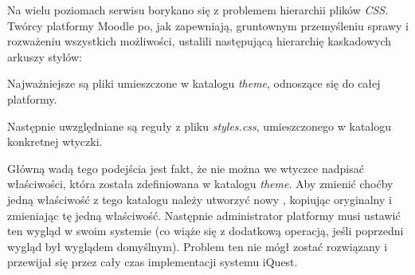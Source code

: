 Na wielu poziomach serwisu borykano się z problemem hierarchii plików \textit{CSS}. Twórcy platformy Moodle po, jak zapewniają, gruntownym przemyśleniu sprawy i rozważeniu wszystkich możliwości, ustalili następującą hierarchię kaskadowych arkuszy stylów:
\begin{description}
\item Najważniejsze są pliki umieszczone w katalogu \textit{theme}, odnoszące się do całej platformy.
\item Następnie uwzględniane są reguły z pliku \textit{styles.css}, umieszczonego w katalogu konkretnej wtyczki.
\end{description}
Główną wadą tego podejścia jest fakt, że nie można we wtyczce nadpisać właściwości, która została zdefiniowana w katalogu \textit{theme}. Aby zmienić choćby jedną właściwość z tego katalogu należy utworzyć nowy , kopiując oryginalny i zmieniając tę jedną właściwość. Następnie administrator platformy musi ustawić ten wygląd w swoim systemie (co wiąże się z dodatkową operacją, jeśli poprzedni wygląd był wyglądem domyślnym). Problem ten nie mógł zostać rozwiązany i przewijał się przez cały czas implementacji systemu iQuest.